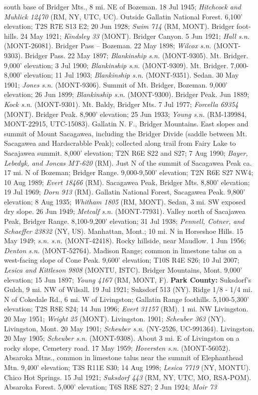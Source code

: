 south base of Bridger Mts., 8 mi. NE of Bozeman. 18 Jul 1945; \textit{Hitchcock and Muhlick 12470} (RM, NY, UTC, UC).  Outside Gallatin National Forest. 6,100’ elevation; T2S R7E S13 E2; 20 Jun 1928; \textit{Swim 714} (RM, MONT).  Bridger foot-hills. 24 May 1921; \textit{Kindsley 33} (MONT).  Bridger Canyon. 5 Jun 1921; \textit{Hall s.n.} (MONT-26081).  Bridger Pass – Bozeman. 22 May 1898; \textit{Wilcox s.n.} (MONT-9303).  Bridger Pass. 22 May 1897; \textit{Blankinship s.n.} (MONT-9305).  Mt. Bridger. 9,000’ elevation; 3 Jul 1900; \textit{Blankinship s.n.} (MONT-9309).  Mt. Bridger. 7,000-8,000’ elevation; 11 Jul 1903; \textit{Blankinship s.n.} (MONT-9351).  Sedan. 30 May 1901; \textit{Jones s.n.} (MONT-9306).  Summit of Mt. Bridger, Bozeman. 9,000’ elevation; 26 Jun 1899; \textit{Blankinship s.n.} (MONT-9300).  Bridger Peak. Jun 1889; \textit{Kock s.n.} (MONT-9301).  Mt. Baldy, Bridger Mts.  7 Jul 1977; \textit{Forcella 69354} (MONT).  Bridger Peak. 8,900’ elevation; 25 Jun 1933; \textit{Young s.n.} (RM-139984, MONT-22915, UTC-15083).  Gallatin N. F., Bridger Mountains.  East slopes and summit of Mount Sacagawea, including the Bridger Divide (saddle between Mt. Sacagawea and Hardscrabble Peak); collected along trail from Fairy Lake to Sacajawea summit. 8,000’ elevation; T2N R6E S22 and S27; 7 Aug 1990; \textit{Bayer, Lebedyk, and Joncas MT-620} (RM).  Just N of the summit of Sacagawea Peak ca. 17 mi. N of Bozeman; Bridger Range. 9,000-9,500’ elevation; T2N R6E S27 NW4; 10 Aug 1989; \textit{Evert 18466} (RM).  Sacagawea Peak, Bridger Mts. 8,800’ elevation; 19 Jul 1969; \textit{Dorn 913} (RM). Gallatin National Forest, Sacagawea Peak. 9,800’ elevation; 8 Aug 1935; \textit{Whitham 1805} (RM, MONT).  Sedan, 3 mi. SW exposed dry slope. 26 Jun 1949; \textit{Metcalf s.n.} (MONT-77931).  Valley north of Sacajawea Peak, Bridger Range. 8,100-9,200’ elevation; 31 Jul 1938; \textit{Pennell, Cotner, and Schaeffer 23832} (NY, US).  Manhattan, Mont.; 10 mi. N in Horseshoe Hills. 15 May 1949; \textit{s.n. s.n.} (MONT-42418).  Rocky hillside, near Maudlow. 1 Jun 1956; \textit{Denton s.n.} (MONT-52764).  Madison Range; common in limestone talus on a west-facing slope of Cone Peak. 9,600’ elevation; T10S R4E S26; 10 Jul 2007; \textit{Lesica and Kittleson 9808} (MONTU, ISTC).  Bridger Mountains, Mont. 9,000’ elevation; 15 Jun 1897; \textit{Young 4167} (RM, MONT, F).  \textbf{Park County:}  Suksdorf's Gulch, 9 mi. NW of Wilsall. 19 Jul 1921; Suksdorf 513 (NY).  Ridge 1/8 - 1/4 mi. N of Cokedale Rd., 6 mi. W of Livingston; Gallatin Range foothills. 5,100-5,300’ elevation; T2S R8E S24; 14 Jun 1996; \textit{Evert 31157} (RM).  1 mi. NW Livingston. 20 May 1951; \textit{Wright 25} (MONT).  Livingston. 1901; \textit{Scheuber 363} (NY).  Livingston, Mont. 20 May 1901; \textit{Scheuber s.n.} (NY-2526, UC-991364).  Livingston. 20 May 1905; \textit{Scheuber s.n.} (MONT-9308).  About 3 mi. E of Livingston on a rocky slope, Cemetery road. 17 May 1959; \textit{Hoversten s.n.} (MONT-56052).  Absaroka Mtns., common in limestone talus near the summit of Elephanthead Mtn.  9,400’ elevation; T3S R11E S30; 14 Aug 1998; \textit{Lesica 7719} (NY, MONTU).  Chico Hot Springs. 15 Jul 1921; \textit{Suksdorf 443} (RM, NY, UTC, MO, RSA-POM).  Absaroka Forest. 5,000’ elevation; T6S R8E S27; 2 Jun 1924; \textit{Moir 73} 